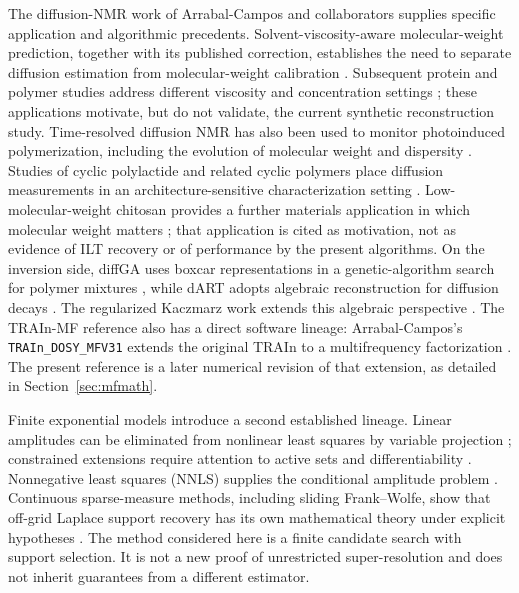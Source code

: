 The diffusion-NMR work of Arrabal-Campos and collaborators supplies specific application and algorithmic precedents. Solvent-viscosity-aware molecular-weight prediction, together with its published correction, establishes the need to separate diffusion estimation from molecular-weight calibration \cite{arrabal2016,arrabal2016correction}. Subsequent protein and polymer studies address different viscosity and concentration settings \cite{protein,concentration}; these applications motivate, but do not validate, the current synthetic reconstruction study. Time-resolved diffusion NMR has also been used to monitor photoinduced polymerization, including the evolution of molecular weight and dispersity \cite{photo2026}. Studies of cyclic polylactide and related cyclic polymers place diffusion measurements in an architecture-sensitive characterization setting \cite{cyclic2021,cyclic2023}. Low-molecular-weight chitosan provides a further materials application in which molecular weight matters \cite{chitosan2026}; that application is cited as motivation, not as evidence of ILT recovery or of performance by the present algorithms. On the inversion side, diffGA uses boxcar representations in a genetic-algorithm search for polymer mixtures \cite{diffga}, while dART adopts algebraic reconstruction for diffusion decays \cite{dart}. The regularized Kaczmarz work extends this algebraic perspective \cite{kaczmarz}. The TRAIn-MF reference also has a direct software lineage: Arrabal-Campos's \texttt{TRAIn\_DOSY\_MFV31} extends the original TRAIn to a multifrequency factorization \cite{train,mfv31}. The present reference is a later numerical revision of that extension, as detailed in Section~\ref{sec:mfmath}.

Finite exponential models introduce a second established lineage. Linear amplitudes can be eliminated from nonlinear least squares by variable projection \cite{golub}; constrained extensions require attention to active sets and differentiability \cite{shearer}. Nonnegative least squares (NNLS) supplies the conditional amplitude problem \cite{lawson}. Continuous sparse-measure methods, including sliding Frank--Wolfe, show that off-grid Laplace support recovery has its own mathematical theory under explicit hypotheses \cite{denoyelle}. The method considered here is a finite candidate search with support selection. It is not a new proof of unrestricted super-resolution and does not inherit guarantees from a different estimator.

